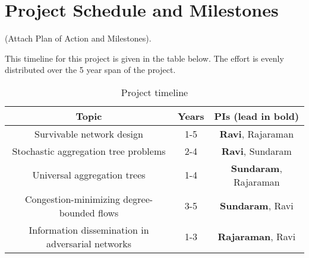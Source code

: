\section{Project Schedule and Milestones}

(Attach Plan of Action and Milestones).

This timeline for this project is given in the table below.  The
effort is evenly distributed over the 5 year span of the
project.

\begin{table}[h]
\begin{tabular}{||c|c|c||}
\hline\hline
{\bf Topic} & {\bf Years} & {\bf PIs (lead in bold)}\\\hline\hline
Survivable network design & 1-5 & {\bf Ravi}, Rajaraman\\\hline
Stochastic aggregation tree problems & 2-4 & {\bf Ravi}, Sundaram\\\hline
Universal aggregation trees  & 1-4 & {\bf Sundaram}, Rajaraman\\ \hline
Congestion-minimizing degree-bounded flows & 3-5 & {\bf Sundaram}, Ravi\\ \hline
Information dissemination in adversarial networks & 1-3 & {\bf Rajaraman}, Ravi\\ \hline
\end{tabular}
\caption{Project timeline}
\end{table}

